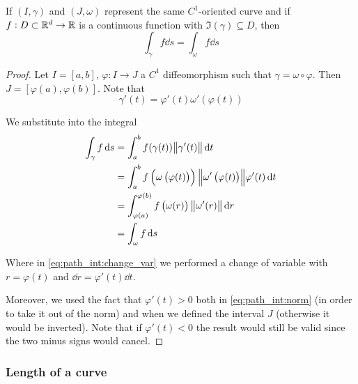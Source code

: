 \documentclass[12pt]{extarticle}
\begin{document}
\begin{proposition}
    \label{prop:path_int:scalar_indep_speed}
    If $(I, \gamma)$ and $(J, \omega)$ represent the same $C^1$-oriented curve and if $f: D \subset \mathbb{R}^d \to \mathbb{R}$  is a continuous function with $\Im(\gamma) \subseteq D$, then
    \begin{equation}
        \int_\gamma f \dd{s} = \int_\omega f \dd{s}
    \end{equation}
\end{proposition}

\begin{proof}
    Let $I = [a, b]$, $\varphi: I \to J$ a $C^1$ diffeomorphism such that $\gamma = \omega \circ \varphi$. Then $J = [\varphi(a), \varphi(b)]$.
    Note that
    \begin{equation}
        \gamma'(t) = \varphi'(t)\omega'(\varphi(t))
    \end{equation}

    We substitute into the integral
    \begin{align}
        \int_\gamma f \dd{s} & = \int_a^b f(\gamma (t)) \norm{\gamma'(t)} \dd{t}                                                                                        \\
                             & =\int_a^b f\left(\omega\left(\varphi (t)\right)\right) \norm{\omega'\left(\varphi(t)\right)} \varphi'(t) \dd{t} \label{eq:path_int:norm} \\
                             & = \int_{\varphi(a)}^{\varphi(b)} f\left(\omega (r)\right) \norm{\omega'(r)} \dd{r} \label{eq:path_int:change_var}                        \\
                             & = \int_\omega f \dd{s}
    \end{align}

    Where in \autoref{eq:path_int:change_var} we performed a change of variable with $r = \varphi(t)$ and $\dd{r} = \varphi'(t) \dd{t}$.

    Moreover, we used the fact that $\varphi'(t) > 0$ both in \autoref{eq:path_int:norm} (in order to take it out of the norm) and when we defined the interval $J$ (otherwise it would be inverted).
    Note that if $\varphi'(t) < 0$ the result would still be valid since the two minus signs would cancel.
\end{proof}

\subsubsection{Length of a curve}
\end{document}

